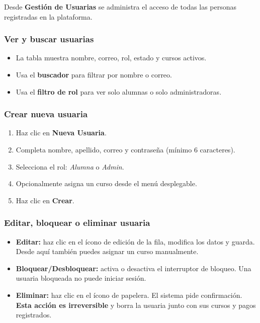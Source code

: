 \documentclass[a4paper,11pt]{article}
\begin{document}
Desde \textbf{Gesti\'on de Usuarias} se administra el acceso de todas las personas
registradas en la plataforma.

\subsubsection{Ver y buscar usuarias}

\begin{itemize}
  \item La tabla muestra nombre, correo, rol, estado y cursos activos.
  \item Usa el \textbf{buscador} para filtrar por nombre o correo.
  \item Usa el \textbf{filtro de rol} para ver solo alumnas o solo administradoras.
\end{itemize}

\subsubsection{Crear nueva usuaria}

\begin{enumerate}
  \item Haz clic en \textbf{Nueva Usuaria}.
  \item Completa nombre, apellido, correo y contrase\~na
        (m\'inimo 6 caracteres).
  \item Selecciona el rol: \emph{Alumna} o \emph{Admin}.
  \item Opcionalmente asigna un curso desde el men\'u desplegable.
  \item Haz clic en \textbf{Crear}.
\end{enumerate}

\subsubsection{Editar, bloquear o eliminar usuaria}

\begin{itemize}
  \item \textbf{Editar:} haz clic en el \'icono de edici\'on de la fila,
        modifica los datos y guarda. Desde aqu\'i tambi\'en puedes
        asignar un curso manualmente.
  \item \textbf{Bloquear/Desbloquear:} activa o desactiva el interruptor de
        bloqueo. Una usuaria bloqueada no puede iniciar sesi\'on.
  \item \textbf{Eliminar:} haz clic en el \'icono de papelera. El sistema
        pide confirmaci\'on. \textbf{Esta acci\'on es irreversible} y borra
        la usuaria junto con sus cursos y pagos registrados.
\end{itemize}
\end{document}
